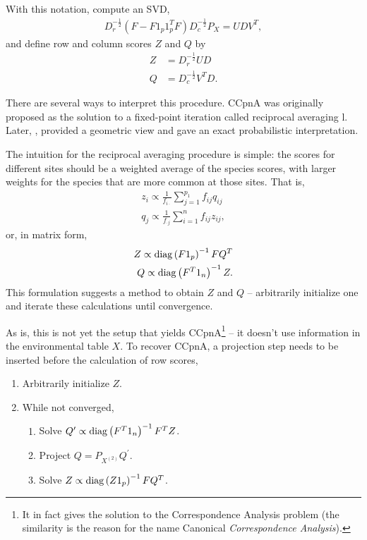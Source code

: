 \documentclass[14pt]{extarticle}
\begin{document}
With this notation, compute an SVD,
\begin{align*}
D_{r}^{-\frac{1}{2}}\left(F - F 1_{p}1_{p}^{T}F\right)D_{c}^{-\frac{1}{2}}P_{X}
= UDV^{T},
\end{align*}
and define row and column scores $Z$ and $Q$ by
\begin{align*}
  Z &= D_{r}^{-\frac{1}{2}} UD \\
  Q &= D_{c}^{-\frac{1}{2}}V^{T}D.
\end{align*}

There are several ways to interpret this procedure. CCpnA was originally
proposed as the solution to a fixed-point iteration called reciprocal averaging
\citep{ter1986canonical}l. Later, \citep{greenacre1987geometric,
  greenacre1984theory}, provided a geometric view and \cite{zhu2005constrained}
gave an exact probabilistic interpretation.

The intuition for the reciprocal averaging procedure is simple: the
scores for different sites should be a weighted average of the species
scores, with larger weights for the species that are more common at
those sites. That is,
\begin{align*}
  z_{i} \propto \frac{1}{f_{i\cdot}}\sum_{j = 1}^{p_{1}}f_{ij}q_{ij} \\
  q_{j} \propto \frac{1}{f_{\cdot j}} \sum_{i = 1}^{n} f_{ij}z_{ij},
\end{align*}
or, in matrix form,
\begin{align*}
Z \propto \mathop\mathrm{diag}\left(F 1_{p}\right)^{-1} F Q^{T} \\
Q \propto \mathop\mathrm{diag}\left(F^{T} 1_{n}\right)^{-1} Z.
\end{align*}
This formulation suggests a method to obtain $Z$ and $Q$ -- arbitrarily
initialize one and iterate these calculations until convergence.

As is, this is not yet the setup that yields CCpnA\footnote{It in fact gives the
  solution to the Correspondence Analysis problem (the similarity is the reason
  for the name Canonical \textit{Correspondence Analysis}).} -- it doesn't use
information in the environmental table $X$. To recover CCpnA, a projection step
needs to be inserted before the calculation of row scores,
\begin{enumerate}
\item Arbitrarily initialize $Z$.
\item While not converged,
\begin{enumerate}
\item Solve $Q^{\prime} \propto \mathop\mathrm{diag}\left(F^{T}1_{n}\right)^{-1}F^{T}Z$.
\item Project $Q = P_{X^{(2)}}Q^{\prime}$.
\item Solve $Z \propto \mathop\mathrm{diag}\left(Z 1_{p}\right)^{-1} F Q^{T}$.
\end{enumerate}
\end{enumerate}
\end{document}
